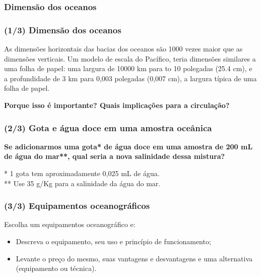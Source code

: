 \documentclass[14pt,xcolor=dvipsnames]{beamer}
\begin{document}
\begin{frame}
    \frametitle{Dimensão dos oceanos}
    \centerline{}
\end{frame}


\begin{frame}
    \frametitle{(1/3) Dimensão dos oceanos}

    \small{As dimensões horizontais das bacias dos oceanos são 1000
    vezes maior que as dimensões verticais.  Um modelo de escala do Pacífico,
    teria dimensões similares a uma folha de papel: uma largura de 10000 km
    para to 10 polegadas (25.4 cm), e a profundidade de 3 km para 0,003 polegadas (0,007 cm), a largura
    típica de uma folha de papel.}
    \pause

    \begin{block}{}
      \bf{Porque isso é importante?  Quais implicações para a circulação?}
    \end{block}
\end{frame}

\begin{frame}
    \frametitle{(2/3) Gota e água doce em uma amostra oceânica}
    \begin{block}{}
        \bf{Se adicionarmos uma gota* de água doce em uma amostra de
        200 mL de água do mar**, qual seria a nova salinidade dessa mistura?}
    \end{block}
    * 1 gota tem aproximadamente 0,025 mL de água.\\
    ** Use 35 g/Kg para a salinidade da água do mar.
\end{frame}


\begin{frame}
    \frametitle{(3/3) Equipamentos oceanográficos}
    \begin{block}{}
        Escolha um equipamentos oceanográfico e:
        \begin{itemize}
          \item Descreva o equipamento, seu uso e  princípio de funcionamento;
          \item Levante o preço do mesmo, suas vantagens e desvantagens e uma
                alternativa (equipamento ou técnica).
        \end{itemize}
    \end{block}
\end{frame}
\end{document}
